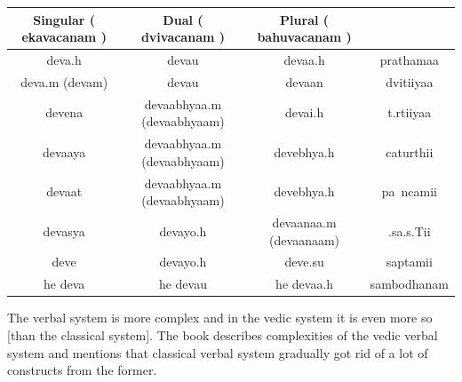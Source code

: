 \documentclass[a4paper, 12pt]{article}
\newcommand \sans[1]{
    \textsanskrit{#1}
}
\begin{document}
\begin{table}[h]
    \centering
\begin{tabular}{|c|c|c|c|}
    \hline 
    Singular (\sans{ekavacanam}) & Dual (\sans{dvivacanam}) & Plural (\sans{bahuvacanam}) &\\
\hline
    \sans{deva.h} & \sans{devau} & \sans{devaa.h} & \sans{prathamaa}\\
\hline
    \sans{deva.m (devam)} & \sans{devau} & \sans{devaan} & \sans{dvitiiyaa}\\
\hline
    \sans{devena} & \sans{devaabhyaa.m (devaabhyaam)} & \sans{devai.h} & \sans{t.rtiiyaa}\\
\hline
    \sans{devaaya} & \sans{devaabhyaa.m (devaabhyaam)} & \sans{devebhya.h} & \sans{caturthii}\\
\hline
    \sans{devaat} & \sans{devaabhyaa.m (devaabhyaam)} & \sans{devebhya.h} & \sans{pa~ncamii}\\
\hline
    \sans{devasya} & \sans{devayo.h} & \sans{devaanaa.m (devaanaam)} & \sans{.sa.s.Tii}\\
\hline
    \sans{deve} & \sans{devayo.h} & \sans{deve.su} & \sans{saptamii}\\
\hline
    \sans{he deva} & \sans{he devau} & \sans{he devaa.h} & \sans{sambodhanam}\\
\hline
\end{tabular}
\end{table}


    The verbal system is more complex and in the vedic system it is even more so [than the classical system]. The book describes complexities of the vedic verbal system and mentions that classical verbal system gradually got rid of a lot of constructs from the former.
    
\end{document}
